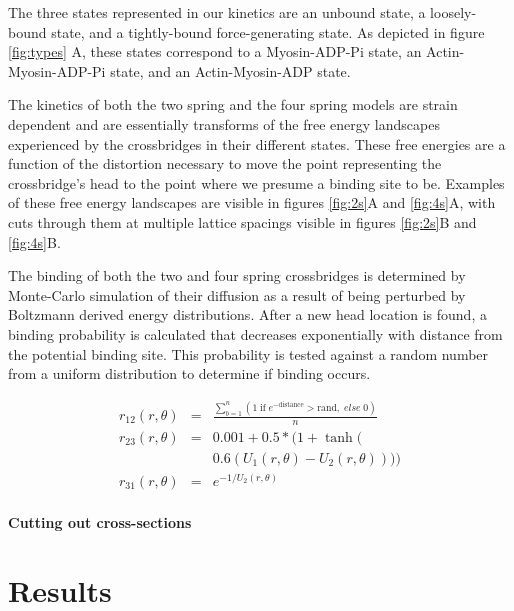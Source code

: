 \documentclass[]{article}
\begin{document}
The three states represented in our kinetics are an unbound state, a loosely-bound state, and a tightly-bound force-generating state.
As depicted in figure \ref{fig:types} A, these states correspond to a Myosin-ADP-Pi state, an Actin-Myosin-ADP-Pi state, and an Actin-Myosin-ADP state.

The kinetics of both the two spring and the four spring models are strain dependent and are essentially transforms of the free energy landscapes experienced by the crossbridges in their different states.
These free energies are a function of the distortion necessary to move the point representing the crossbridge's head to the point where we presume a binding site to be.
Examples of these free energy landscapes are visible in figures \ref{fig:2s}A and \ref{fig:4s}A, with cuts through them at multiple lattice spacings visible in figures \ref{fig:2s}B and \ref{fig:4s}B.

The binding of both the two and four spring crossbridges is determined by Monte-Carlo simulation of their diffusion as a result of being perturbed by Boltzmann derived energy distributions. 
After a new head location is found, a binding probability is calculated that decreases exponentially with distance from the potential binding site. 
This probability is tested against a random number from a uniform distribution to determine if binding occurs.



\begin{eqnarray}  
\label{eq:KineticRates}
	r_{12}(r, \theta)   & = & \frac{\sum_{b=1}^n (1\; \textrm{if}\; e^{-\textrm{distance}}>\textrm{rand} ,\; else\; 0)}{n}  \nonumber \\
    r_{23}(r, \theta)   & = & 0.001 + 0.5 * (1 + \tanh( \nonumber \\
                        &   & 0.6 (U_1(r, \theta) - U_2(r, \theta)))) \\
	r_{31}(r, \theta)   & = & e^{-1 / U_2(r, \theta)}
\end{eqnarray} 


\paragraph*{Cutting out cross-sections}




\section{Results} %
\end{document}
